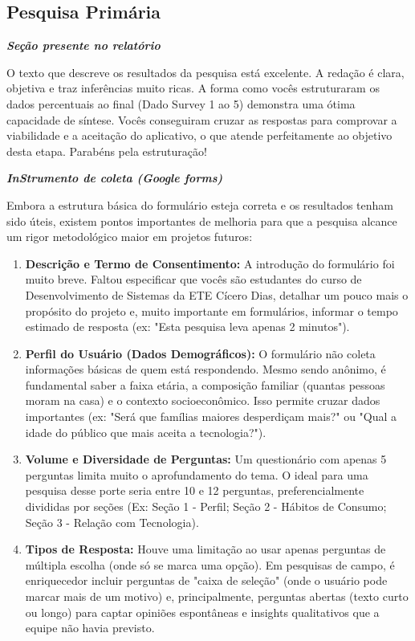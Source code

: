 \documentclass[
  sigconf,
  nonacm, %
  language=portuguese
]{acmart}
\newcommand{\statuswarn}[1]{{\small\bfseries\color{cwarn}#1}}
\begin{document}
\subsection{Pesquisa Primária}

\noindent\statuswarn{0,85\,/\,1,00 pts · Completo c/ ressalvas}

\textit{\textbf{Seção presente no relatório}}

O texto que descreve os resultados da pesquisa está excelente. A redação é clara, objetiva e traz inferências muito ricas. A forma como vocês estruturaram os dados percentuais ao final (Dado Survey 1 ao 5) demonstra uma ótima capacidade de síntese. Vocês conseguiram cruzar as respostas para comprovar a viabilidade e a aceitação do aplicativo, o que atende perfeitamente ao objetivo desta etapa. Parabéns pela estruturação!

\textit{\textbf{InStrumento de coleta (Google forms)}}

Embora a estrutura básica do formulário esteja correta e os resultados tenham sido úteis, existem pontos importantes de melhoria para que a pesquisa alcance um rigor metodológico maior em projetos futuros:

\begin{enumerate}[leftmargin=14pt,itemsep=2pt,topsep=4pt]
  \item \textbf{Descrição e Termo de Consentimento:} A introdução do formulário foi muito breve. Faltou especificar que vocês são estudantes do curso de Desenvolvimento de Sistemas da ETE Cícero Dias, detalhar um pouco mais o propósito do projeto e, muito importante em formulários, informar o tempo estimado de resposta (ex: "Esta pesquisa leva apenas 2 minutos").
  \item \textbf{Perfil do Usuário (Dados Demográficos):} O formulário não coleta informações básicas de quem está respondendo. Mesmo sendo anônimo, é fundamental saber a faixa etária, a composição familiar (quantas pessoas moram na casa) e o contexto socioeconômico. Isso permite cruzar dados importantes (ex: "Será que famílias maiores desperdiçam mais?" ou "Qual a idade do público que mais aceita a tecnologia?").
  \item \textbf{Volume e Diversidade de Perguntas:} Um questionário com apenas 5 perguntas limita muito o aprofundamento do tema. O ideal para uma pesquisa desse porte seria entre 10 e 12 perguntas, preferencialmente divididas por seções (Ex: Seção 1 - Perfil; Seção 2 - Hábitos de Consumo; Seção 3 - Relação com Tecnologia).
  \item \textbf{Tipos de Resposta:} Houve uma limitação ao usar apenas perguntas de múltipla escolha (onde só se marca uma opção). Em pesquisas de campo, é enriquecedor incluir perguntas de "caixa de seleção" (onde o usuário pode marcar mais de um motivo) e, principalmente, perguntas abertas (texto curto ou longo) para captar opiniões espontâneas e insights qualitativos que a equipe não havia previsto.
\end{enumerate}
\end{document}
